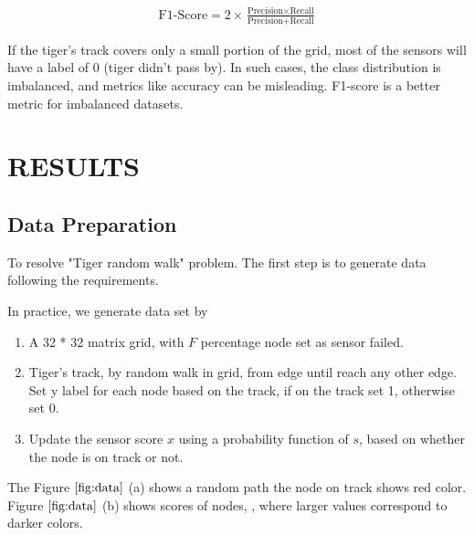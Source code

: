 \documentclass{article}
\begin{document}
\begin{align}
  \text{F1-Score} = 2 \times \frac{\text{Precision} \times \text{Recall}}{\text{Precision} + \text{Recall}}
\end{align}

If the tiger's track covers only a small portion of the grid, most of the sensors will have a label of 0 (tiger didn't pass by). In such cases, the class distribution is imbalanced, and metrics like accuracy can be misleading. F1-score is a better metric for imbalanced datasets.

\section{RESULTS}
\label{sec:results}

\subsection{Data Preparation}
\label{ssec:data}
To resolve "Tiger random walk" problem. 
The first step is to generate data following the requirements.

In practice, we generate data set by

\begin{enumerate}
  \item A 32 * 32 matrix grid, with $F$ percentage node set as sensor failed.
  \item Tiger's track, by random walk in grid, from edge until reach any other edge.
        \\ Set y label for each node based on the track, if on the track set 1, otherwise set 0.
  \item Update the sensor score $x$ using a probability function of $s$, based on whether the node is on track or not.
\end{enumerate}

The Figure $\ref{fig:data}$ (a) shows a random path the node on track shows red color.
Figure $\ref{fig:data}$ (b) shows scores of nodes, , where larger values correspond to darker colors.
\end{document}
